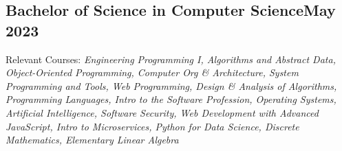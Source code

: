 \subsection{{Bachelor of Science in Computer Science\hfill May 2023}}
\begin{zitemize}
\item Relevant Courses: \textit{Engineering Programming I, Algorithms and Abstract Data, Object-Oriented Programming, Computer Org \& Architecture, System Programming and Tools, Web Programming, Design \& Analysis of Algorithms, Programming Languages, Intro to the Software Profession, Operating Systems, Artificial Intelligence, Software Security, Web Development with Advanced JavaScript, Intro to Microservices, Python for Data Science, Discrete Mathematics, Elementary Linear Algebra}
\end{zitemize}



